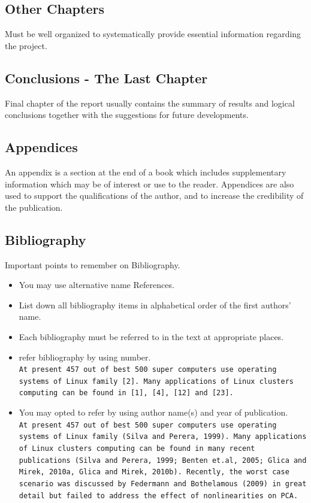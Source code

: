 \subsection{Other Chapters}

Must be well organized to systematically provide essential information regarding the project.

\subsection{Conclusions - The Last Chapter}

Final chapter of the report usually contains the summary of results and logical conclusions together with the suggestions for future developments.

\subsection{Appendices}

An appendix  is a section at the end of a book which includes supplementary information which may be of interest 
or use to the reader. Appendices are also used to support the qualifications of the author, and to increase the credibility of the publication.

\subsection{Bibliography}

Important points to remember on Bibliography.\\

\begin{itemize}
   \item You may use alternative name References.
   \item List down all bibliography items in alphabetical order of the first authors' name. 
   \item Each bibliography must be referred to in the text at appropriate places.
   \item refer bibliography by using number. \\
   \texttt{At present 457 out of best 500 super computers use operating systems of Linux family [2]. Many applications of Linux clusters computing can be found in [1], [4], [12] and [23]. 
   }
   \item You may opted to refer by using author name(s) and year of publication.\\
   \texttt{At present 457 out of best 500 super computers use operating systems of Linux family (Silva and Perera, 1999). Many applications of Linux clusters computing can be found in many recent publications (Silva and Perera, 1999; Benten et.al, 2005; Glica and Mirek, 2010a, Glica and Mirek, 2010b). Recently, the worst case scenario was discussed by Federmann and Bothelamous (2009) in great detail but failed to address the effect of nonlinearities on PCA.
   }
\end{itemize}
 

